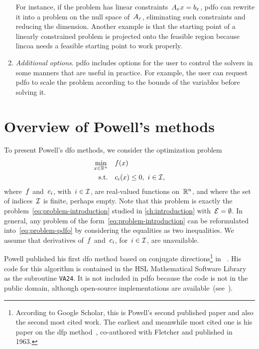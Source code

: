 \begin{enumerate}
    For instance, if the problem has linear constraints~$A_{\scriptscriptstyle\ieq} \iter = b_{\scriptscriptstyle\ieq}$, \gls{pdfo} can rewrite it into a problem on the null space of~$A_{\scriptscriptstyle\mathcal{E}}$, eliminating such constraints and reducing the dimension.
    Another example is that the starting point of a linearly constrained problem is projected onto the feasible region because \gls{lincoa} needs a feasible starting point to work properly.
    \item \emph{Additional options}.
    \gls{pdfo} includes options for the user to control the solvers in some manners that are useful in practice.
    For example, the user can request \gls{pdfo} to scale the problem according to the bounds of the variables before solving it.
\end{enumerate}

\section{Overview of Powell's  methods}
\label{sec:powell}

To present Powell's \gls{dfo} methods, we consider the optimization problem
\begin{subequations}
    \label{eq:problem-pdfo}
    \begin{align}
        \min_{\iter \in \R^n}   & \quad \obj(\iter)\\
        \text{s.t.}             & \quad \con{i}(\iter) \le 0, ~ i \in \iub,
    \end{align}
\end{subequations}
where~$f$ and~$c_{i}$, with~$i \in \mathcal{I}$, are real-valued functions on~$\mathbb{R}^n$, and where the set of indices~$\mathcal{I}$ is finite, perhaps empty.
Note that this problem is exactly the problem~\cref{eq:problem-introduction} studied in \cref{ch:introduction} with~$\mathcal{E} = \emptyset$.
In general, any problem of the form~\cref{eq:problem-introduction} can be reformulated into~\cref{eq:problem-pdfo} by considering the equalities as two inequalities.
We assume that derivatives of~$f$ and~$c_{i}$, for~$i \in \mathcal{I}$, are unavailable.

Powell published his first \gls{dfo} method based on conjugate directions\footnote{According to Google Scholar, this is Powell's second published paper and also the second most cited work. The earliest and meanwhile most cited one is his paper on the \gls{dfp} method~\cite{Fletcher_Powell_1963}, co-authored with Fletcher and published in 1963.} in \citeyear{Powell_1964}~\cite{Powell_1964}.
His code for this algorithm is contained in the HSL Mathematical Software Library~\cite{HSL} as the subroutine \texttt{VA24}.
It is not included in \gls{pdfo} because the code is not in the public domain, although open-source implementations are available~(see~\cite[Fn.~4]{Conn_Scheinberg_Toint_1997b}).

